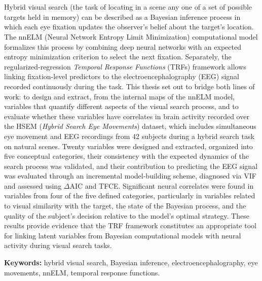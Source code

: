 \chapter*{\runtitle}

\noindent 

Hybrid visual search (the task of locating in a scene any one of a set of possible targets held in memory) can be described as a Bayesian inference process in which each eye fixation updates the observer's belief about the target's location. The nnELM (Neural Network Entropy Limit Minimization) computational model \citep{ruarte2025} formalizes this process by combining deep neural networks with an expected entropy minimization criterion to select the next fixation. Separately, the regularized-regression \textit{Temporal Response Functions} (TRFs) framework \citep{care2025} allows linking fixation-level predictors to the electroencephalography (EEG) signal recorded continuously during the task. This thesis set out to bridge both lines of work: to design and extract, from the internal maps of the nnELM model, variables that quantify different aspects of the visual search process, and to evaluate whether these variables have correlates in brain activity recorded over the HSEM (\textit{Hybrid Search Eye Movements}) dataset, which includes simultaneous eye movement and EEG recordings from 42 subjects during a hybrid search task on natural scenes. Twenty variables were designed and extracted, organized into five conceptual categories, their consistency with the expected dynamics of the search process was validated, and their contribution to predicting the EEG signal was evaluated through an incremental model-building scheme, diagnosed via VIF and assessed using $\Delta$AIC and TFCE. Significant neural correlates were found in variables from four of the five defined categories, particularly in variables related to visual similarity with the target, the state of the Bayesian process, and the quality of the subject's decision relative to the model's optimal strategy. These results provide evidence that the TRF framework constitutes an appropriate tool for linking latent variables from Bayesian computational models with neural activity during visual search tasks.

\bigskip

\noindent\textbf{Keywords:} hybrid visual search, Bayesian inference, electroencephalography, eye movements, nnELM, temporal response functions.
